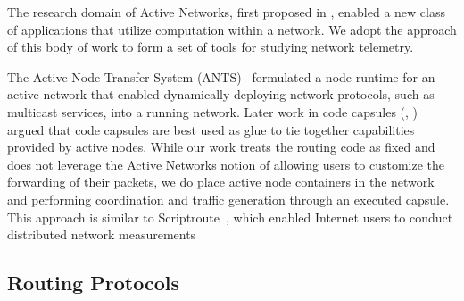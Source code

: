 The research domain of Active Networks, first proposed in
\cite{tennenhouse2002towards}, enabled a new class of applications that utilize
computation within a network. We adopt the approach of this body of work to
form a set of tools for studying network telemetry.

The Active Node Transfer System (ANTS)~\cite{wetherall1998ants} formulated a
node runtime for an active network that enabled dynamically deploying network
protocols, such as multicast services, into a running network. Later work in
code capsules (\cite{tennenhouse1997survey}, \cite{wetherall2002active}) argued
that code capsules are best used as glue to tie together capabilities provided
by active nodes. While our work treats the routing code as fixed and does not
leverage the Active Networks notion of allowing users to customize the
forwarding of their packets, we do place active node containers in the network
and performing coordination and traffic generation through an executed capsule.
This approach is similar to Scriptroute~\cite{spring2003scriptroute}, which
enabled Internet users to conduct distributed network measurements

\subsection{Routing Protocols}

